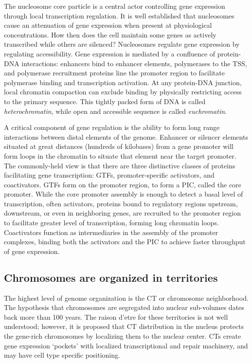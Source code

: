 The nucleosome core particle is a central actor controlling gene expression through local transcription regulation.  It is well established that nucleosomes
cause an attenuation of gene expression when present at physiological concentrations\cite{brown1984}\cite{lorch1987}\cite{laybourn1991}\cite{juan1994}. How
then does the cell maintain some genes as actively transcribed while others are silenced?  Nucleosomes regulate gene expression by regulating accessibility.
Gene expression is mediated by a confluence of protein-DNA interactions: enhancers bind to enhancer elements, polymerases to the \gls{TSS}, and polymerase
recruitment proteins line the promoter region to facilitate polymerase binding and transcription activation\cite{cox2008}.  At any protein-DNA junction,
local chromatin compaction can exclude binding by physically restricting access to the primary sequence.  This tightly packed form of DNA is called
\textit{\gls{heterochromatin}}, while open and accessible sequence is called \textit{\gls{euchromatin}}.

A critical component of gene regulation is the ability to form long range interactions between distal elements of the genome.  Enhancer or silencer elements
situated at great distances (hundreds of kilobases) from a gene promoter will form loops in the chromatin to situate that element near the target
promoter\cite{heintzman2007}.  The commonly-held view is that there are three distinctive classes of proteins facilitating gene transcription: \glspl{GTF},
promoter-specific activators, and coactivators\cite{manston2006}.  \glspl{GTF} form on the promoter region, to form a \gls{PIC}, called
the \gls{core promoter}.  While the \gls{core promoter} assembly is enough to detect a basal level of transcription, often activators, proteins bound
to regulatory regions upstream, downstream, or even in neighboring genes, are recruited to the promoter region to facilitate greater level of
transcription, forming long chromatin loops\cite{ptashne1997}.  Coactivators function as intermediaries in the assembly of the promoter complexes, binding
both the activators and the \gls{PIC} to achieve faster throughput of gene expression\cite{manston2006}.

\subsection*{Chromosomes are organized in territories}

The highest level of genome organization is the \gls{CT} or chromosome neighborhood\cite{cremer2001}.  The hypothesis that chromosomes are segregated into
nuclear sub-volumes dates back more than 100 years\cite{cremer1993}.  The raison d'etre for these territories is not well understood; however, it is proposed
that \gls{CT} distribution in the nucleus protects the gene-rich chromosomes by localizing them to the nuclear center\cite{boyle2001}\cite{federico2006}.
\glspl{CT} create gene expression `pockets' with localized transcriptional and repair machinery\cite{bolzer2005}, and may have cell type specific positioning.


